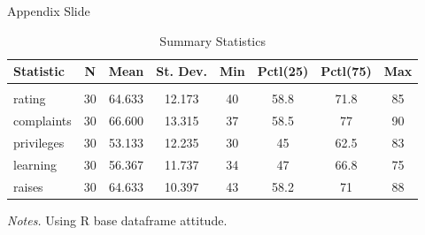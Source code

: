 \documentclass[aspectratio=169,t]{beamer}
\begin{document}
\begin{frame}{Appendix Slide}{\hyperlink{main1}{}}\label{appendix1}
  \begin{table}
    \caption{Summary Statistics}
    \label{appendix_summ_stat}
    \begin{adjustbox}{max width = \textwidth, width = 0.7\textwidth, center}
      \begin{threeparttable}
        \begin{tabular}{@{} lccccccc @{}} 
          \toprule
          Statistic & \multicolumn{1}{c}{N} & \multicolumn{1}{c}{Mean} & \multicolumn{1}{c}{St. Dev.} & \multicolumn{1}{c}{Min} & \multicolumn{1}{c}{Pctl(25)} & \multicolumn{1}{c}{Pctl(75)} & \multicolumn{1}{c}{Max} \\ 
          \hline \\[-1.8ex] 
          rating & 30 & 64.633 & 12.173 & 40 & 58.8 & 71.8 & 85 \\ 
          complaints & 30 & 66.600 & 13.315 & 37 & 58.5 & 77 & 90 \\ 
          privileges & 30 & 53.133 & 12.235 & 30 & 45 & 62.5 & 83 \\ 
          learning & 30 & 56.367 & 11.737 & 34 & 47 & 66.8 & 75 \\ 
          raises & 30 & 64.633 & 10.397 & 43 & 58.2 & 71 & 88 \\ 
          \bottomrule
        \end{tabular} 

        \begin{tablenotes}
            \item \textit{Notes.} Using R base dataframe attitude.
        \end{tablenotes}
      \end{threeparttable}
    \end{adjustbox}
  \end{table}
\end{frame}
\end{document}
